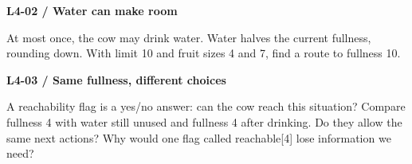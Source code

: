 \documentclass[11pt,a4paper]{article}
\begin{document}
\par\noindent\begin{minipage}{\linewidth}
\textbf{L4-02 / Water can make room}\par\smallskip At most once, the cow may drink water. Water halves the current fullness, rounding down. With limit 10 and fruit sizes 4 and 7, find a route to fullness 10.\par
\end{minipage}\par\vspace{4mm}
\par\noindent\begin{minipage}{\linewidth}
\textbf{L4-03 / Same fullness, different choices}\par\smallskip A reachability flag is a yes/no answer: can the cow reach this situation? Compare fullness 4 with water still unused and fullness 4 after drinking. Do they allow the same next actions? Why would one flag called reachable[4] lose information we need?\par
\end{minipage}\par\vspace{4mm}
\end{document}
